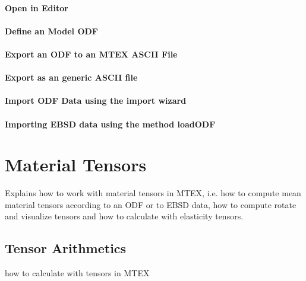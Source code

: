 \documentclass{article}
\begin{document}
                  
			\paragraph{Open in Editor}
		
			\paragraph{Define an Model ODF}
		
			\paragraph{Export an ODF to an MTEX ASCII File}
		
			\paragraph{Export as an generic ASCII file}
		
			\paragraph{Import ODF Data using the import wizard}
		
			\paragraph{Importing EBSD data using the method loadODF}
		
		\section{Material Tensors}

		
                  \begin{par}
Explains how to work with material tensors in MTEX, i.e. how to compute mean material tensors according to an ODF or to EBSD data, how to compute rotate and visualize tensors and how to calculate with elasticity tensors.
\end{par} \vspace{1em}

               
		\subsection{Tensor Arithmetics}

		
                     \begin{par}
how to calculate with tensors in MTEX
\end{par} \vspace{1em}
\end{document}
